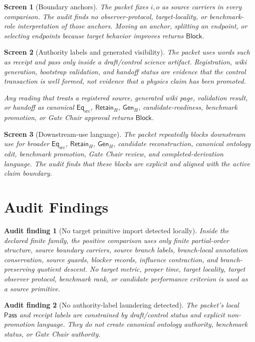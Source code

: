 \documentclass[11pt]{article}
\newcommand{\EqSrc}{\mathsf{Eq}_{\mathrm{src}}}
\newcommand{\RetainH}{\mathsf{Retain}_{H}}
\newcommand{\GenH}{\mathsf{Gen}_{H}}
\newcommand{\Pass}{\mathsf{Pass}}
\newcommand{\Block}{\mathsf{Block}}
\newtheorem{auditfinding}{Audit finding}
\newtheorem{screen}{Screen}
\begin{document}
\begin{screen}[Boundary anchors]
The packet fixes \(i,o\) as source carriers in every comparison. The
audit finds no observer-protocol, target-locality, or benchmark-role
interpretation of those anchors. Moving an anchor, splitting an endpoint,
or selecting endpoints because target behavior improves returns
\(\Block\).
\end{screen}

\begin{screen}[Authority labels and generated visibility]
The packet uses words such as receipt and pass only inside a
draft/control science artifact. Registration, wiki generation, bootstrap
validation, and handoff status are evidence that the control transaction
is well formed, not evidence that a physics claim has been promoted.

Any reading that treats a registered source, generated wiki page,
validation result, or handoff as canonical \(\EqSrc\), \(\RetainH\),
\(\GenH\), candidate-readiness, benchmark promotion, or Gate Chair
approval returns \(\Block\).
\end{screen}

\begin{screen}[Downstream-use language]
The packet repeatedly blocks downstream use for broader \(\EqSrc\),
\(\RetainH\), \(\GenH\), candidate reconstruction, canonical ontology
edit, benchmark promotion, Gate Chair review, and completed-derivation
language. The audit finds that these blocks are explicit and aligned
with the active claim boundary.
\end{screen}

\section{Audit Findings}

\begin{auditfinding}[No target primitive import detected locally]
Inside the declared finite family, the positive comparison uses only
finite partial-order structure, source boundary carriers, source branch
labels, branch-local annotation conservation, source guards, blocker
records, influence contraction, and branch-preserving quotient descent.
No target metric, proper time, target locality, target observer protocol,
benchmark rank, or candidate performance criterion is used as a source
primitive.
\end{auditfinding}

\begin{auditfinding}[No authority-label laundering detected]
The packet's local \(\Pass\) and receipt labels are constrained by
draft/control status and explicit non-promotion language. They do not
create canonical ontology authority, benchmark status, or Gate Chair
authority.
\end{auditfinding}
\end{document}

